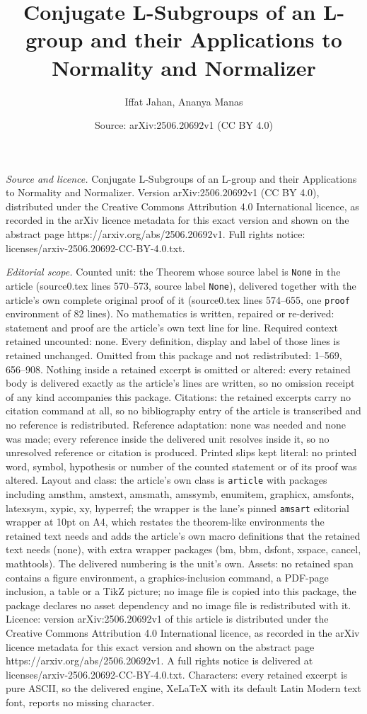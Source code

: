 \documentclass[10pt,a4paper]{amsart}
\title[Conjugate L-Subgroups of an L-group and their Applications t]{Conjugate L-Subgroups of an L-group and their Applications to Normality and Normalizer}
\author{Iffat Jahan, Ananya Manas}
\date{Source: arXiv:2506.20692v1 (CC BY 4.0)}
\begin{document}
\maketitle

\noindent\emph{Source and licence.} Conjugate L-Subgroups of an L-group and their Applications to Normality and Normalizer. Version arXiv:2506.20692v1 (CC BY 4.0), distributed under the Creative Commons Attribution 4.0 International licence, as recorded in the arXiv licence metadata for this exact version and shown on the abstract page https://arxiv.org/abs/2506.20692v1. Full rights notice: licenses/arxiv-2506.20692-CC-BY-4.0.txt.\par\smallskip

\noindent\textit{Editorial scope.} Counted unit: the Theorem whose source label is \texttt{None} in the article (source0.tex lines 570--573, source label \texttt{None}), delivered together with the article's own complete original proof of it (source0.tex lines 574--655, one \texttt{proof} environment of 82 lines). No mathematics is written, repaired or re-derived: statement and proof are the article's own text line for line. Required context retained uncounted: none. Every definition, display and label of those lines is retained unchanged. Omitted from this package and not redistributed: 1--569, 656--908. Nothing inside a retained excerpt is omitted or altered: every retained body is delivered exactly as the article's lines are written, so no omission receipt of any kind accompanies this package. Citations: the retained excerpts carry no citation command at all, so no bibliography entry of the article is transcribed and no reference is redistributed. Reference adaptation: none was needed and none was made; every reference inside the delivered unit resolves inside it, so no unresolved reference or citation is produced. Printed slips kept literal: no printed word, symbol, hypothesis or number of the counted statement or of its proof was altered. Layout and class: the article's own class is \texttt{article} with packages including amsthm, amstext, amsmath, amssymb, enumitem, graphicx, amsfonts, latexsym, xypic, xy, hyperref; the wrapper is the lane's pinned \texttt{amsart} editorial wrapper at 10pt on A4, which restates the theorem-like environments the retained text needs and adds the article's own macro definitions that the retained text needs (none), with extra wrapper packages (bm, bbm, dsfont, xspace, cancel, mathtools). The delivered numbering is the unit's own. Assets: no retained span contains a figure environment, a graphics-inclusion command, a PDF-page inclusion, a table or a TikZ picture; no image file is copied into this package, the package declares no asset dependency and no image file is redistributed with it. Licence: version arXiv:2506.20692v1 of this article is distributed under the Creative Commons Attribution 4.0 International licence, as recorded in the arXiv licence metadata for this exact version and shown on the abstract page https://arxiv.org/abs/2506.20692v1. A full rights notice is delivered at licenses/arxiv-2506.20692-CC-BY-4.0.txt. Characters: every retained excerpt is pure ASCII, so the delivered engine, XeLaTeX with its default Latin Modern text font, reports no missing character.
\end{document}
